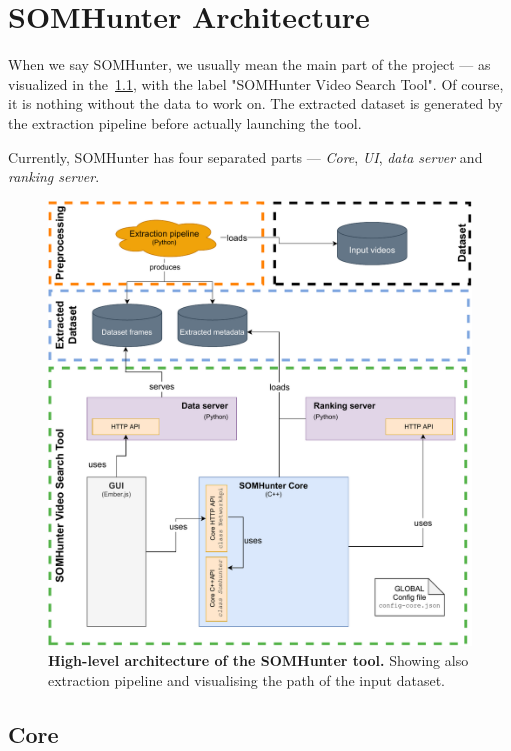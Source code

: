 \chapter{SOMHunter Architecture}
\label{arch}


When we say SOMHunter, we usually mean the main part of the project --- as visualized in the~\cref{fig:sh-arch}, with the label "SOMHunter Video Search Tool". Of course, it is nothing without the data to work on. The extracted dataset is generated by the extraction pipeline before actually launching the tool.

Currently, SOMHunter has four separated parts --- \emph{Core}, \emph{UI}, \emph{data server} and \emph{ranking server}.


\begin{figure}[h]
	\centering
	\includegraphics[width=1.0\textwidth]{img/diagrams/sh-arch.pdf}
	\caption{\textbf{High-level architecture of the SOMHunter tool.} Showing also extraction pipeline and visualising the path of the input dataset.}
	\label{fig:sh-arch}
\end{figure}

\section{Core}

